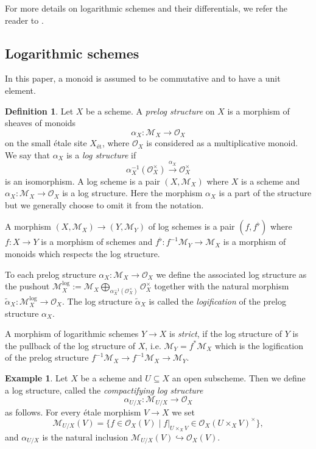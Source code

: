 \documentclass{amsart}
\def\et{\textrm{\'et}}
\theoremstyle{definition}
\newtheorem{definition}[theorem]{Definition}
\newtheorem{example}[theorem]{Example}
\newcommand\llog{\mathrm{log}}
\newcommand{\mM}{\mathcal{M}}
\numberwithin{equation}{section}
\begin{document}
For more details on logarithmic schemes and their differentials, we refer the reader to \cite{Ogus}.
\subsection{Logarithmic schemes}
In this paper, a monoid is assumed to be commutative and to have a unit element. 
\begin{definition}\label{def:LogScheme}
	Let $X$ be a scheme. A \textit{prelog structure} on $X$ is a morphism of sheaves of monoids
	\[
	\alpha_X:\mathcal{M}_X\to \mathcal{O}_X
	\]
	on the small \'etale site $X_\et$, where $\mathcal{O}_X$ is considered as a multiplicative monoid.  We say that $\alpha_X$ is a \emph{log structure} if 
	\[
	\alpha_X^{-1}(\mathcal{O}_X^{\times})\xrightarrow{\alpha_X} \mathcal{O}_X^{\times}
	\]
	is an isomorphism. A log scheme is a pair $(X,\mathcal{M}_X)$ where $X$ is a scheme and $\alpha_X:\mathcal{M}_X\to \mathcal{O}_X$ is a log structure. Here the morphism $\alpha_X$ is a part of the structure but we generally choose to omit it from the notation.
	
	A morphism $(X,\mathcal{M}_X)\to (Y,\mathcal{M}_Y)$ of log schemes is a pair $(f,f^{\flat})$ where $f:X\to Y$ is a morphism of schemes and $f^{\flat}:f^{-1}\mathcal{M}_Y\to \mathcal{M}_X$ is a morphism of monoids which respects the log structure. 
	
	To each prelog structure $\alpha_X:\mathcal{M}_X\to \mathcal{O}_X$ we define the associated log structure as the pushout  $\mathcal{M}^\llog_X:=\mathcal{M}_X\bigoplus_{\alpha_X^{-1}(\mathcal{O}_X^{\times})}\mathcal{O}_X^{\times}$ together with the natural morphism $\tilde{\alpha}_X:\mathcal{M}^\llog_X\to \mathcal{O}_X$.   The log structure $\tilde{\alpha}_X$ is called the \emph{logification} of the prelog structure $\alpha_X$.

	A morphism of logarithmic schemes $Y\to X$ is \emph{strict}, if the log structure of $Y$ is the pullback of the log structure of $X$, i.e. $\mM_Y= f^*\mM_X$ which is the logification of the prelog structure $f^{-1}\mM_X\to f^{-1}\mM_X\to \mM_Y$.
\end{definition}


\begin{example}
	Let $X$ be a scheme and $U\subseteq X$ an open subscheme. Then we define a log structure, called the \textit{compactifying log structure}
	\[
	\alpha_{U/X}:\mathcal{M}_{U/X}\to \mathcal{O}_X
	\]
	as follows. For every étale morphism $V\to X$ we set
	\[
	\mathcal{M}_{U/X}(V)=\{f\in\mathcal{O}_X(V)\mid f|_{U\times_X V}\in\mathcal{O}_X(U\times_X V)^\times\},
	\]
	and $\alpha_{U/X}$ is the natural inclusion $\mathcal{M}_{U/X}(V)\hookrightarrow\mathcal{O}_X(V)$.
\end{example}
\end{document}
